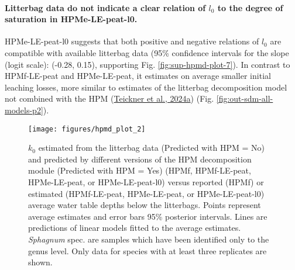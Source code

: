 \documentclass[
  12pt,
]{article}
\begin{document}
\hypertarget{litterbag-data-do-not-indicate-a-clear-relation-of-l_0-to-the-degree-of-saturation-in-hpme-le-peat-l0.}{%
\paragraph*{\texorpdfstring{Litterbag data do not indicate a clear relation of \(l_0\) to the degree of saturation in HPMe-LE-peat-l0.}{Litterbag data do not indicate a clear relation of l\_0 to the degree of saturation in HPMe-LE-peat-l0.}}\label{litterbag-data-do-not-indicate-a-clear-relation-of-l_0-to-the-degree-of-saturation-in-hpme-le-peat-l0.}}

HPMe-LE-peat-l0 suggests that both positive and negative relations of \(l_0\) are compatible with available litterbag data (95\% confidence intervals for the slope (logit scale): (-0.28, 0.15), supporting Fig. \ref{fig:sup-hpmd-plot-7}). In contrast to HPMf-LE-peat and HPMe-LE-peat, it estimates on average smaller initial leaching losses, more similar to estimates of the litterbag decomposition model not combined with the HPM (\protect\hyperlink{ref-Teickner.2024}{Teickner et al., 2024a}) (Fig. \ref{fig:out-sdm-all-models-p2}).



\begin{figure}[H]

{\centering \texttt{[image: figures/hpmd\_plot\_2]} 

}

\caption{\(k_0\) estimated from the litterbag data (Predicted with HPM = No) and predicted by different versions of the HPM decomposition module (Predicted with HPM = Yes) (HPMf, HPMf-LE-peat, HPMe-LE-peat, or HPMe-LE-peat-l0) versus reported (HPMf) or estimated (HPMf-LE-peat, HPMe-LE-peat, or HPMe-LE-peat-l0) average water table depths below the litterbags. Points represent average estimates and error bars 95\% posterior intervals. Lines are predictions of linear models fitted to the average estimates. \emph{Sphagnum} spec. are samples which have been identified only to the genus level. Only data for species with at least three replicates are shown.}\label{fig:out-p-hpm-mm27-2-mm29-1-mm30-1-p2}
\end{figure}
\end{document}
